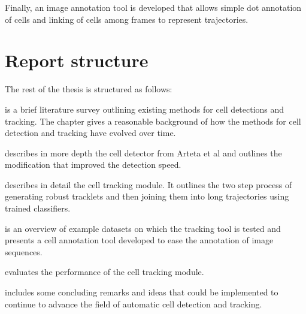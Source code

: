 		Finally, an image annotation tool is developed that allows simple dot annotation of cells and linking of cells among frames to represent trajectories.
		
	\section{Report structure \statusfirstdraft}
		The rest of the thesis is structured as follows:
		
		 is a brief literature survey outlining existing methods for cell detections and tracking. The chapter gives a reasonable background of how the methods for cell detection and tracking have evolved over time.
		
		 describes in more depth the cell detector from Arteta et al \cite{arteta12} and outlines the modification that improved the detection speed.
		
		 describes in detail the cell tracking module. It outlines the two step process of generating robust tracklets and then joining them into long trajectories using trained classifiers.
	
		 is an overview of example datasets on which the tracking tool is tested and presents a cell annotation tool developed to ease the annotation of image sequences.
		
		 evaluates the performance of the cell tracking module. 
		
		 includes some concluding remarks and ideas that could be implemented to continue to advance the field of automatic cell detection and tracking.